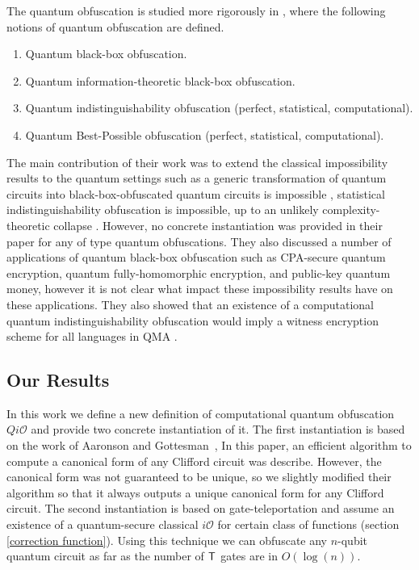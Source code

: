 The quantum obfuscation is studied more rigorously in \cite{AF16a}, where the following notions of quantum obfuscation are defined.
\begin{enumerate}
\item Quantum black-box obfuscation.
\item Quantum information-theoretic black-box obfuscation.
\item Quantum indistinguishability obfuscation (perfect, statistical, computational).
\item Quantum Best-Possible obfuscation (perfect, statistical, computational).
\end{enumerate}

 The main contribution of their work was to extend the classical impossibility results to the quantum settings such as a generic transformation of quantum circuits into black-box-obfuscated quantum circuits is impossible \cite{AF16arxiv},  statistical indistinguishability obfuscation is impossible, up to an unlikely complexity-theoretic collapse \cite{AF16arxiv}. However, no concrete instantiation was provided in their paper for any of type quantum obfuscations. They also discussed a number of applications of quantum black-box obfuscation such as CPA-secure quantum encryption, quantum fully-homomorphic encryption, and public-key quantum money, however it is not clear what impact these impossibility results have on these applications. They also showed that an existence of a computational quantum indistinguishability obfuscation would imply a witness encryption scheme for all languages in QMA \cite{arXiv:1602.01771v1}.


\subsection{Our Results}
In this work we define a new definition of computational quantum obfuscation $Qi\mathcal{O}$ and provide two concrete instantiation of it. The first instantiation is based on the work of Aaronson and Gottesman~\cite{AG04}, In this paper, an efficient algorithm to compute a canonical form of any Clifford circuit was describe. However, the canonical form was not guaranteed to be unique, so we slightly modified their algorithm so that it always outputs a unique canonical form for any Clifford circuit. The second instantiation is based on gate-teleportation \cite{} and assume an existence of a quantum-secure classical $i\mathcal{O}$ for certain class of functions (section \ref{correction function}). Using this technique we can obfuscate any $n$-qubit quantum circuit as far as the number of ${\sf T}$ gates are in $O(\log(n)).$






